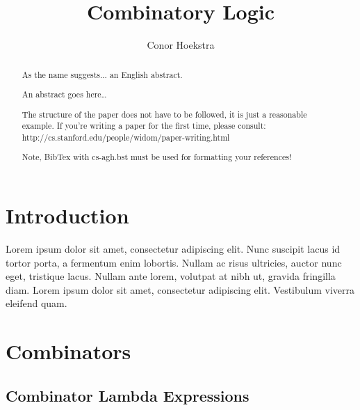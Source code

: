 \documentclass[10pt]{article}
\begin{document}
\begin{opening}

\title{Combinatory Logic}
\author[conorhoekstra@gmail.com, Toronto, ON, Canada]{Conor Hoekstra}

\begin{abstract}
  As the name suggests... an English abstract.
\end{abstract}

\begin{abstract}
An abstract goes here\ldots
	
The structure of the paper does not have to be followed, it is just
a reasonable example. If you're writing a paper for the first time, please consult:
http://cs.stanford.edu/people/widom/paper-writing.html

Note, BibTex with cs-agh.bst must be used for formatting your references!
\end{abstract}


\end{opening}

\section{Introduction}

Lorem ipsum dolor sit amet, consectetur adipiscing elit. Nunc suscipit lacus id tortor porta, a fermentum enim lobortis. Nullam ac risus ultricies, auctor nunc eget, tristique lacus. Nullam ante lorem, volutpat at nibh ut, gravida fringilla diam. Lorem ipsum dolor sit amet, consectetur adipiscing elit. Vestibulum viverra eleifend quam.

\section{Combinators}

\subsection{Combinator Lambda Expressions}
\end{document}
